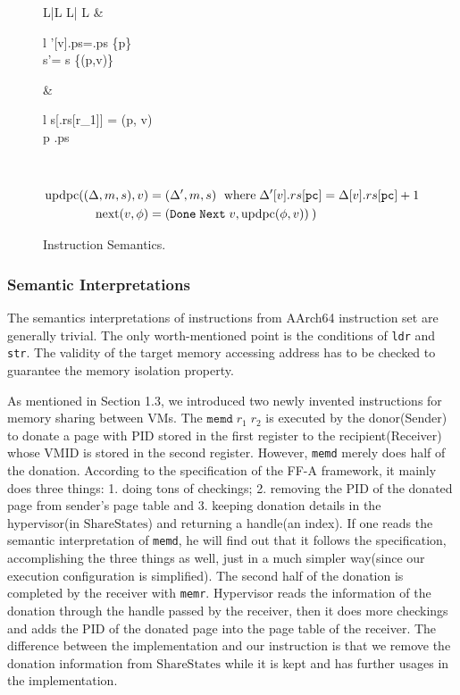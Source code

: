 \documentclass[a4paper]{article}
\newcommand*{\SSS}{\text{ShareStates}}
\newcommand*{\PID}{\text{PID}}
\newcommand*{\VMID}{\text{VMID}}
\newcommand*{\instr}[1]{\texttt{#1}}
\newcommand*{\updpc}{\text{updpc}}
\begin{document}
\begin{figure}[h!]
\begin{adjustwidth}{-1cm}{}
\begin{tabular}[t]{L|L L| L}
                                 &\!\!\!\!\! \begin{array}{l}
                                               \Delta'[v].ps=\Delta[v].ps \cup \{p\}\\
                                               s'= s \setminus \{(p,v)\}
                                             \end{array}
                      &\leftshift\begin{array}{l}
                                   s[\Delta[v].rs[r_{1}]] = (p, v)\\
                                   \land p \notin \Delta[v].ps
                                 \end{array} \\\hline
    \end{tabular}
  \end{adjustwidth}
  \begin{align*}
    \updpc((\Delta,m,s),v)&=(\Delta',m,s)\ \; \text{where}\; \Delta'[v].rs[\mathtt{pc}] = \Delta[v].rs[\mathtt{pc}]+1\\
    \nextt(v,\phi) &= \DNXT{v}{\phi}
  \end{align*}
  \caption{Instruction Semantics.}
\end{figure}

\subsubsection{Semantic Interpretations}
The semantics interpretations of instructions from AArch64 instruction set are generally
trivial. The only worth-mentioned point is the conditions of \instr{ldr} and
\instr{str}. The validity of the target memory accessing address has to be
checked to guarantee the memory isolation property.

As mentioned in Section 1.3, we introduced two newly invented instructions for
memory sharing between VMs. The $\instr{memd}\; r_{1}\; r_{2}$ is executed by
the donor(Sender) to donate a page with $\PID$ stored in the first register to
the recipient(Receiver) whose $\VMID$ is stored in the second register. However,
\instr{memd} merely does half of the donation. According to the specification of
the FF-A framework, it mainly does three things: 1. doing tons of checkings; 2.
removing the $\PID$ of the donated page from sender's page table and 3. keeping
donation details in the hypervisor(in $\SSS$) and returning a handle(an index).
If one reads the semantic interpretation of \instr{memd}, he will find out that
it follows the specification, accomplishing the three things as well,
just in a much simpler way(since our execution configuration is simplified). The second half of the donation is
completed by the receiver with \instr{memr}. Hypervisor reads the information of
the donation through the handle passed by the receiver, then it does more
checkings and adds the $\PID$ of the donated page into the page table of the
receiver. The difference between the implementation and our
instruction is that we remove the donation information from $\SSS$ while it is
kept and has further usages in the implementation.

\end{document}
